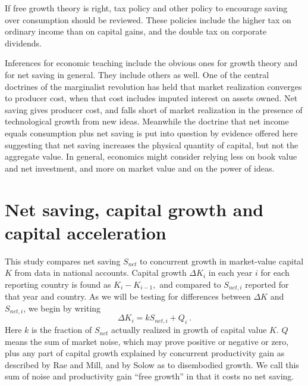 \documentclass[a4paper,fleqn]{latex_styles/cas-sc}
\begin{document}
If free growth theory is right, tax policy and other policy to encourage
saving over consumption should be reviewed. These policies
include the higher tax on ordinary income than on capital gains, and the
double tax on corporate dividends.

Inferences for economic teaching include the obvious ones for growth
theory and for net saving in general. They include others as well.
One of the central doctrines of the marginalist revolution has held that
market realization converges to producer cost, when that cost includes
imputed interest on assets owned. Net saving gives producer cost,
and falls short of market realization in the presence of technological
growth from new ideas. Meanwhile the doctrine that net income equals
consumption plus net saving is put into question by evidence offered
here suggesting that net saving increases the physical quantity of
capital, but not the aggregate value. In general, economics might
consider relying less on book value and net investment, and more on market value and on the
power of ideas.

\hypertarget{net-saving-and-capital-growth}{%
\section{Net saving, capital growth and capital acceleration}\label{net-saving-and-capital-growth}}

This study compares net saving \(S_{net}\) to concurrent growth in
market-value capital \(K\) from data in national accounts. Capital
growth \({\Delta K}_{i}\) in each year \(i\) for each reporting country
is found as \(K_{i} - K_{i - 1},\) and compared to \(S_{net,i}\)
reported for that year and country. As we will be testing for
differences between \(\Delta K\) and \(S_{net,i}\), we begin by writing
%
\begin{equation}
\Delta K_{i} = k S_{net,i} + Q_{i}\ .\label{eq-1}
\end{equation}
%
Here \(k\) is the fraction of \(S_{net}\) actually realized in growth of capital value \(K\). \(Q\) means the sum of market noise, which may prove
positive or negative or zero, plus any part of capital growth explained
by concurrent productivity gain as described by Rae and Mill, and by
Solow as to disembodied growth. We call this sum of noise and
productivity gain ``free growth'' in that it costs no net saving.
\end{document}
